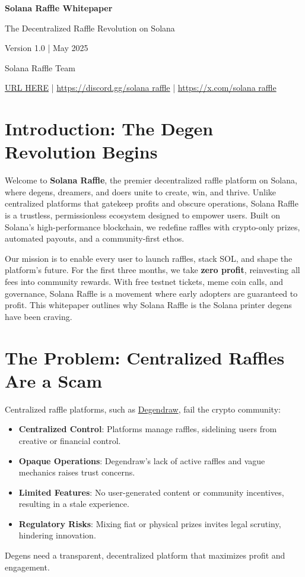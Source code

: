 \documentclass[12pt]{article}
\begin{document}
\begin{titlepage}
    \centering
    \vspace*{2cm}
    {\Huge\bfseries Solana Raffle Whitepaper\par}
    \vspace{1cm}
    {\Large The Decentralized Raffle Revolution on Solana\par}
    \vspace{2cm}
    {\large Version 1.0 | May 2025\par}
    \vspace{1cm}
    {\large Solana Raffle Team\par}
    \vfill
    {\small \url{URL HERE} | \url{https://discord.gg/solana raffle} | \url{https://x.com/solana raffle}\par}
\end{titlepage}

\tableofcontents
\newpage

\section{Introduction: The Degen Revolution Begins}
Welcome to \textbf{Solana Raffle}, the premier decentralized raffle platform on Solana, where degens, dreamers, and doers unite to create, win, and thrive. Unlike centralized platforms that gatekeep profits and obscure operations, Solana Raffle is a trustless, permissionless ecosystem designed to empower users. Built on Solana’s high-performance blockchain, we redefine raffles with crypto-only prizes, automated payouts, and a community-first ethos.

Our mission is to enable every user to launch raffles, stack SOL, and shape the platform’s future. For the first three months, we take \textbf{zero profit}, reinvesting all fees into community rewards. With free testnet tickets, meme coin calls, and governance, Solana Raffle is a movement where early adopters are guaranteed to profit. This whitepaper outlines why Solana Raffle is the Solana printer degens have been craving.

\section{The Problem: Centralized Raffles Are a Scam}
Centralized raffle platforms, such as \href{https://degendraw.vercel.app/}{Degendraw}, fail the crypto community:
\begin{itemize}
    \item \textbf{Centralized Control}: Platforms manage raffles, sidelining users from creative or financial control.
    \item \textbf{Opaque Operations}: Degendraw’s lack of active raffles and vague mechanics raises trust concerns.
    \item \textbf{Limited Features}: No user-generated content or community incentives, resulting in a stale experience.
    \item \textbf{Regulatory Risks}: Mixing fiat or physical prizes invites legal scrutiny, hindering innovation.
\end{itemize}
Degens need a transparent, decentralized platform that maximizes profit and engagement.
\end{document}
